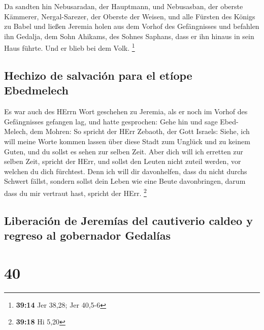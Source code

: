  Da sandten hin Nebusaradan, der Hauptmann, und
Nebusasban, der oberste Kämmerer, Nergal-Sarezer, der Oberste der
Weisen, und alle Fürsten des Königs zu Babel  und ließen
Jeremia holen aus dem Vorhof des Gefängnisses und befahlen ihn Gedalja,
dem Sohn Ahikams, des Sohnes Saphans, dass er ihn hinaus in sein Haus
führte. Und er blieb bei dem Volk. \footnote{\textbf{39:14} Jer 38,28;
  Jer 40,5-6}

\hypertarget{hechizo-de-salvaciuxf3n-para-el-etuxedope-ebedmelech}{%
\subsection{Hechizo de salvación para el etíope
Ebedmelech}\label{hechizo-de-salvaciuxf3n-para-el-etuxedope-ebedmelech}}

 Es war auch des HErrn Wort geschehen zu Jeremia, als er
noch im Vorhof des Gefängnisses gefangen lag, und hatte gesprochen:
 Gehe hin und sage Ebed-Melech, dem Mohren: So spricht
der HErr Zebaoth, der Gott Israels: Siehe, ich will meine Worte kommen
lassen über diese Stadt zum Unglück und zu keinem Guten, und du sollst
es sehen zur selben Zeit.  Aber dich will ich erretten
zur selben Zeit, spricht der HErr, und sollst den Leuten nicht zuteil
werden, vor welchen du dich fürchtest.  Denn ich will dir
davonhelfen, dass du nicht durchs Schwert fällst, sondern sollst dein
Leben wie eine Beute davonbringen, darum dass du mir vertraut hast,
spricht der HErr. \footnote{\textbf{39:18} Hi 5,20}

\hypertarget{liberaciuxf3n-de-jeremuxedas-del-cautiverio-caldeo-y-regreso-al-gobernador-gedaluxedas}{%
\subsection{Liberación de Jeremías del cautiverio caldeo y regreso al
gobernador
Gedalías}\label{liberaciuxf3n-de-jeremuxedas-del-cautiverio-caldeo-y-regreso-al-gobernador-gedaluxedas}}

\hypertarget{section-39}{%
\section{40}\label{section-39}}

